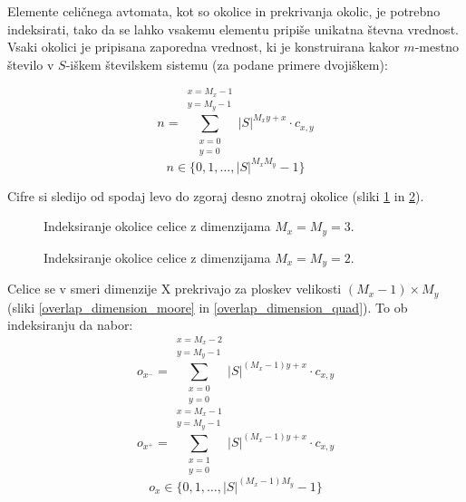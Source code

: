 \documentclass[12pt,a4paper,openany,twoside]{book}
\begin{document}
Elemente celičnega avtomata, kot so okolice in prekrivanja okolic, je potrebno indeksirati,
tako da se lahko vsakemu elementu pripiše unikatna števna vrednost.
Vsaki okolici je pripisana zaporedna vrednost, ki je konstruirana kakor \(m\)-mestno število
v \(S\)-iškem številskem sistemu (za podane primere dvojiškem):

\begin{equation}
n = \sum_{\substack{x=0 \\ y=0}}^{\substack{x=M_x-1 \\ y=M_y-1}} |S|^{M_x y + x} \cdot c_{x,y}
\end{equation}
\begin{equation}
n \in \{0, 1, \dots, |S|^{M_x M_y}-1\}
\end{equation}

Cifre si sledijo od spodaj levo do zgoraj desno znotraj okolice
(sliki \ref{neighborhood_index_moore} in \ref{neighborhood_index_quad}).

\begin{figure}[htb]
\centerline{}
\caption[Indeksiranje okolice \(3 \times 3\).]{Indeksiranje okolice celice z dimenzijama \(M_x=M_y=3\).}
\label{neighborhood_index_moore}
\end{figure}

\begin{figure}[htb]
\centerline{}
\caption[Indeksiranje okolice \(2 \times 2\).]{Indeksiranje okolice celice z dimenzijama \(M_x=M_y=2\).}
\label{neighborhood_index_quad}
\end{figure}

Celice se v smeri dimenzije X prekrivajo za ploskev velikosti \((M_x-1) \times M_y\) (sliki \ref{overlap_dimension_moore} in \ref{overlap_dimension_quad}).
To ob indeksiranju da nabor:
\begin{equation}
o_{x^-} = \sum_{\substack{x=0 \\ y=0}}^{\substack{x=M_x-2 \\ y=M_y-1}} |S|^{(M_x-1) y + x} \cdot c_{x,y}
\end{equation}
\begin{equation}
o_{x^+} = \sum_{\substack{x=1 \\ y=0}}^{\substack{x=M_x-1 \\ y=M_y-1}} |S|^{(M_x-1) y + x} \cdot c_{x,y}
\end{equation}
\begin{equation}
o_x \in \{0, 1, \dots, |S|^{(M_x-1)M_y}-1\}
\end{equation}
\end{document}
